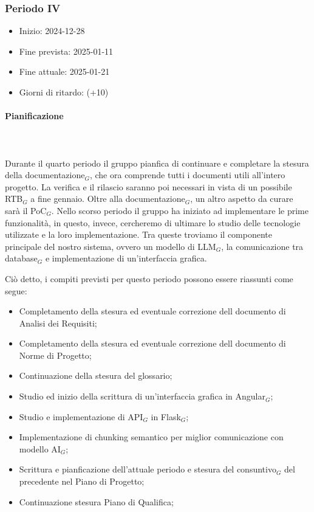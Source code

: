 \subsubsection{Periodo IV}

\begin{itemize}
    \item Inizio: 2024-12-28
    \item Fine prevista: 2025-01-11
    \item Fine attuale: 2025-01-21
    \item Giorni di ritardo: (+10)
\end{itemize}
\paragraph{Pianificazione} \hspace{1cm}
\\ \hspace{1cm} \\
Durante il quarto periodo il gruppo pianfica di continuare e completare la stesura della documentazione$_G$, che ora comprende tutti i documenti utili all'intero progetto. La verifica e il rilascio saranno poi necessari in vista di un possibile RTB$_G$ a fine gennaio. Oltre alla documentazione$_G$, un altro aspetto da curare sarà il PoC$_G$. Nello scorso periodo il gruppo ha iniziato ad implementare le prime funzionalità, in questo, invece, cercheremo di ultimare lo studio delle tecnologie utilizzate e la loro implementazione. Tra queste troviamo il componente principale del nostro sistema, ovvero un modello di LLM$_G$, la comunicazione tra database$_G$ e implementazione di un'interfaccia grafica. 

Ciò detto, i compiti previsti per questo periodo possono essere riassunti come segue:  
\begin{itemize}
    \item Completamento della stesura ed eventuale correzione dell documento di Analisi dei Requisiti;
    \item Completamento della stesura ed eventuale correzione dell documento di Norme di Progetto;
    \item Continuazione della stesura del glossario;
    \item Studio ed inizio della scrittura di un'interfaccia grafica in Angular$_G$;
    \item Studio e implementazione di API$_G$ in Flask$_G$;
    \item Implementazione di chunking semantico per miglior comunicazione con modello AI$_G$;
    \item Scrittura e pianficazione  dell'attuale periodo e stesura del consuntivo$_G$ del precedente nel Piano di Progetto;
    \item Continuazione stesura Piano di Qualifica;
\end{itemize}

